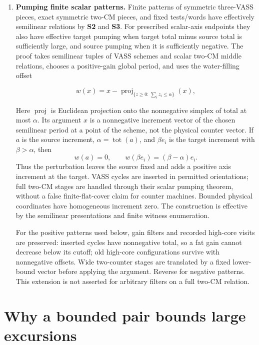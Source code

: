 \documentclass[11pt,a4paper]{article}
\theoremstyle{remark}
\newcommand{\tot}[1]{\operatorname{tot}(#1)}
\DeclareMathOperator{\proj}{proj}
\begin{document}
\begin{enumerate}[label=\textup{(\alph*)},leftmargin=*]
\item\label{item:ingredient-f} \textbf{Pumping finite scalar patterns.} Finite patterns of symmetric three-VASS pieces, exact symmetric two-CM pieces, and fixed tests/words have effectively semilinear relations by \textbf{S2} and \textbf{S3}. For prescribed scalar-axis endpoints they also have effective target pumping when target total minus source total is sufficiently large, and source pumping when it is sufficiently negative. The proof takes semilinear tuples of VASS schemes and scalar two-CM middle relations, chooses a positive-gain global period, and uses the water-filling offset

\begin{equation*}
w(x)=x-\proj_{\{z\geq 0:\,\sum_i z_i\leq\alpha\}}(x),
\end{equation*}


Here \(\proj\) is Euclidean projection onto the nonnegative
simplex of total at most \(\alpha\). Its argument \(x\) is a
nonnegative increment vector of the chosen semilinear period at a
point of the scheme, not the physical counter vector. If \(a\) is the
source increment, \(\alpha=\tot a\), and \(\beta e_i\) is the target
increment with \(\beta>\alpha\), then
\[
 w(a)=0,\qquad w(\beta e_i)=(\beta-\alpha)e_i.
\]
Thus the perturbation leaves the source fixed and adds a positive
axis increment at the target. VASS cycles are inserted in permitted orientations; full two-CM stages are handled through their scalar pumping theorem, without a false finite-flat-cover claim for counter machines. Bounded physical coordinates have homogeneous increment zero. The construction is effective by the semilinear presentations and finite witness enumeration.

For the positive patterns used below, gain filters and recorded high-core visits are preserved: inserted cycles have nonnegative total, so a fat gain cannot decrease below its cutoff; old high-core configurations survive with nonnegative offsets. Wide two-counter stages are translated by a fixed lower-bound vector before applying the argument. Reverse for negative patterns. This extension is not asserted for arbitrary filters on a full two-CM relation.

\end{enumerate}

\section{Why a bounded pair bounds large excursions}\label{sec:pair}
\end{document}

